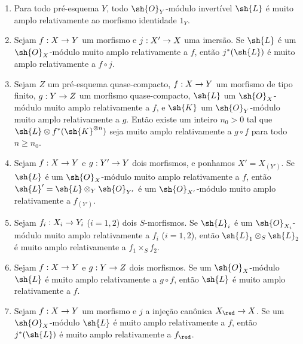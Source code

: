 \documentclass[oneside,10pt]{amsart}
\makeatletter
\renewcommand{\geq}{\geqslant}
\newcommand{\ega@arrow}[2]{\mathchoice{#1}{#2}{#2}{#2}}
\renewcommand{\to}{\ega@arrow{\longrightarrow}{\rightarrow}}
\let\EGAOriginalLabel\label
\renewcommand{\label}[1]{\phantomsection\EGAOriginalLabel{#1}}
\makeatother
\begin{document}
\begin{proposition}[4.4.10]
\label{II.4.4.10}
\medskip\noindent
\begin{enumerate}
  \item[\rm{(i)}] Para todo pré-esquema $Y$, todo $\sh{O}_Y$-módulo invertível $\sh{L}$ é muito amplo relativamente ao morfismo identidade $1_Y$.
  \item[\rm{(i \emph{bis})}] Sejam $f:X\to Y$ um morfismo e $j:X'\to X$ uma imersão.
  Se $\sh{L}$ é um $\sh{O}_X$-módulo muito amplo relativamente a $f$, então $j^*(\sh{L})$ é muito amplo relativamente a $f\circ j$.
  \item[\rm{(ii)}] Sejam $Z$ um pré-esquema quase-compacto, $f:X\to Y$ um morfismo de tipo finito, $g:Y\to Z$ um morfismo quase-compacto, $\sh{L}$ um $\sh{O}_X$-módulo muito amplo relativamente a $f$, e $\sh{K}$ um $\sh{O}_Y$-módulo muito amplo relativamente a $g$.
  Então existe um inteiro $n_0>0$ tal que $\sh{L}\otimes f^*(\sh{K}^{\otimes n})$ seja muito amplo relativamente a $g\circ f$ para todo $n\geq n_0$.
  \item[\rm{(iii)}] Sejam $f:X\to Y$ e $g:Y'\to Y$ dois morfismos, e ponhamos $X'=X_{(Y')}$.
  Se $\sh{L}$ é um $\sh{O}_X$-módulo muito amplo relativamente a $f$, então $\sh{L}'=\sh{L}\otimes_Y\sh{O}_{Y'}$ é um $\sh{O}_{X'}$-módulo muito amplo relativamente a $f_{(Y')}$.
  \item[\rm{(iv)}] Sejam $f_i:X_i\to Y_i$ ($i=1,2$) dois $S$-morfismos.
  Se $\sh{L}_i$ é um $\sh{O}_{X_i}$-módulo muito amplo relativamente a $f_i$ ($i=1,2$), então $\sh{L}_1\otimes_S\sh{L}_2$ é muito amplo relativamente a $f_1\times_S f_2$.
  \item[\rm{(v)}] Sejam $f:X\to Y$ e $g:Y\to Z$ dois morfismos.
  Se um $\sh{O}_X$-módulo $\sh{L}$ é muito amplo relativamente a $g\circ f$, então $\sh{L}$ é muito amplo relativamente a $f$.
  \item[\rm{(vi)}] Sejam $f:X\to Y$ um morfismo e $j$ a injeção canônica $X_\red\to X$.
  Se um $\sh{O}_X$-módulo $\sh{L}$ é muito amplo relativamente a $f$, então $j^*(\sh{L})$ é muito amplo relativamente a $f_\red$.
\end{enumerate}
\end{proposition}
\end{document}
